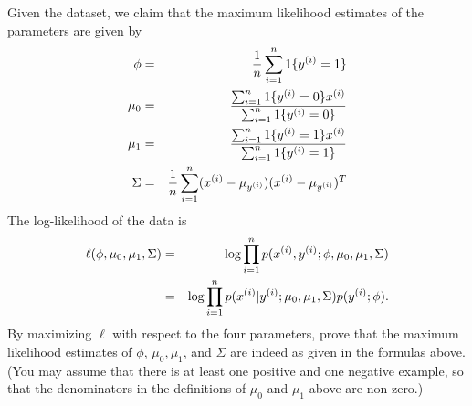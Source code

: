 \item {}
Given the dataset, we claim that the maximum likelihood estimates of the parameters are given by
\begin{eqnarray*}
    \phi &=& \frac{1}{{n}} \sum_{i=1}^{n} 1\{y^{(i)} = 1\} \\
    \mu_{0} &=& \frac{\sum_{i=1}^{n} 1\{y^{(i)} = {0}\} x^{(i)}}{\sum_{i=1}^{n} 1\{y^{(i)} = {0}\}} \\
    \mu_1 &=& \frac{\sum_{i=1}^{n} 1\{y^{(i)} = 1\} x^{(i)}}{\sum_{i=1}^{n} 1\{y^{(i)} = 1\}} \\
    \Sigma &=& \frac{1}{{n}} \sum_{i=1}^{n} (x^{(i)} - \mu_{y^{(i)}}) (x^{(i)} - \mu_{y^{(i)}})^T
\end{eqnarray*}
The log-likelihood of the data is
\begin{eqnarray*}
    \ell(\phi, \mu_{0}, \mu_1, \Sigma) &=& \log \prod_{i=1}^{n} p(x^{(i)} , y^{(i)}; \phi, \mu_{0}, \mu_1, \Sigma) \\
    &=& \log \prod_{i=1}^{n} p(x^{(i)} \vert  y^{(i)}; \mu_{0}, \mu_1, \Sigma) p(y^{(i)}; \phi).
\end{eqnarray*}
By maximizing $\ell$ with respect to the four parameters, prove that the maximum likelihood estimates of $\phi$, $\mu_{0}, \mu_1$, and $\Sigma$ are indeed as given in the formulas above.  (You may assume that there is at least one positive and one negative example, so that the denominators in the definitions of $\mu_{0}$ and $\mu_1$ above are non-zero.)
